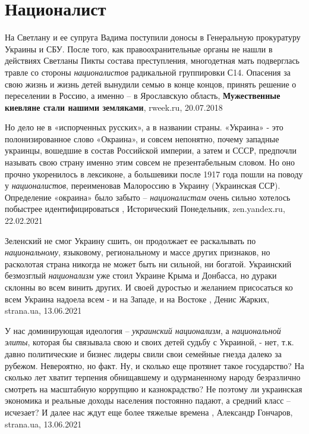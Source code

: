  
 
 
 
 
\chapter{Националист}
\label{sec:slova.nacionalist}

На Светлану и ее супруга Вадима поступили доносы в Генеральную прокуратуру
Украины и СБУ. После того, как правоохранительные органы не нашли в действиях
Светланы Пикты состава преступления, многодетная мать подверглась травле со
стороны \emph{националистов} радикальной группировки С14. Опасения за свою
жизнь и жизнь детей вынудили семью в конце концов, принять решение о
переселении в Россию, а именно – в Ярославскую область,
\textbf{Мужественные киевляне стали нашими земляками}, rweek.ru, 20.07.2018

Но дело не в «испорченных русских», а в названии страны. «Украина» - это
полонизированное слово «Окраина», и совсем непонятно, почему западные украинцы,
вошедшие в состав Российской империи, а затем и СССР, предпочли называть свою
страну именно этим совсем не презентабельным словом. Но оно прочно укоренилось
в лексиконе, а большевики после 1917 года пошли на поводу у \emph{националистов},
переименовав Малороссию в Украину (Украинская ССР). Определение «окраина» было
забыто – \emph{националистам} очень сильно хотелось побыстрее идентифицироваться
, 
Исторический Понедельник, zen.yandex.ru, 22.02.2021 

Зеленский не смог Украину сшить, он продолжает ее раскалывать по \emph{национальному},
языковому, региональному и массе других признаков, но расколотая страна никогда
не может быть ни сильной, ни богатой. Украинский безмозглый \emph{национализм}
уже стоил Украине Крыма и Донбасса, но дураки склонны во всем винить других. И
своей дуростью и желанием присосаться ко всем Украина надоела всем - и на
Западе, и на Востоке
, 
Денис Жарких, strana.ua, 13.06.2021

У нас доминирующая идеология – \emph{украинский национализм}, а \emph{национальной элиты},
которая бы связывала свою и своих детей судьбу с Украиной, - нет, т.к. давно
политические и бизнес лидеры свили свои семейные гнезда далеко за рубежом.
Невероятно, но факт.  Ну, и сколько еще протянет такое государство? На сколько
лет хватит терпения обнищавшему и одурманенному народу безразлично смотреть на
масштабную коррупцию и казнокрадство?  Не поэтому ли украинская экономика и
реальные доходы населения постоянно падают, а средний класс – исчезает? И далее
нас ждут еще более тяжелые времена
, 
Александр Гончаров, strana.ua, 13.06.2021

